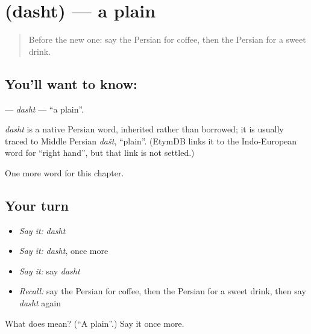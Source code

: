\section[\texorpdfstring{\fa{دشت} (dasht)}{دشت (dasht)}]{ (dasht) — a plain}

\label{lesson:FA-C102-dasht}



\begin{quote}
Before the new one: say the Persian for coffee, then the Persian for a sweet drink.
\end{quote}

\subsection*{You'll want to know: }
\textbf{} — \emph{dasht} — \textquotedblleft{}a plain\textquotedblright{}.

\begin{cousinweb}
\emph{dasht} is a native Persian word, inherited rather than borrowed; it is usually traced to Middle Persian \emph{dašt}, \textquotedblleft{}plain\textquotedblright{}. (EtymDB links it to the Indo-European word for \textquotedblleft{}right hand\textquotedblright{}, but that link is not settled.)
\end{cousinweb}

\begin{grammarlens}[title={What you've built}]
One more word for this chapter.
\end{grammarlens}

\subsection*{Your turn}
\begin{itemize}
\raggedright
  \item \emph{Say it:} \emph{dasht}
  \item \emph{Say it:} \emph{dasht}, once more
  \item \emph{Say it:} say \emph{dasht}
  \item \emph{Recall:} say the Persian for coffee, then the Persian for a sweet drink, then say \emph{dasht} again
\end{itemize}

\begin{tcolorbox}[breakable,colback=teal!4,colframe=teal!35!black,title={Before you move on}]
What does  mean? (\textquotedblleft{}A plain\textquotedblright{}.) Say it once more.
\end{tcolorbox}

